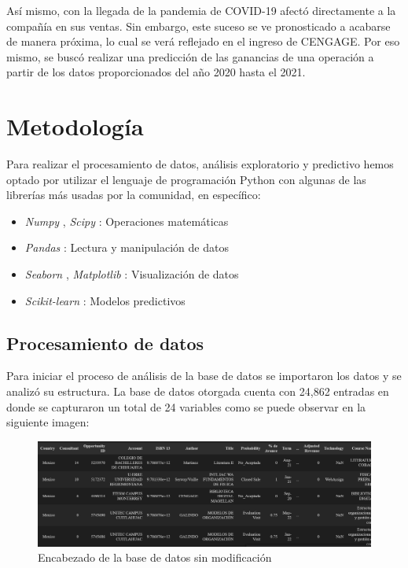 \documentclass{article}
\begin{document}
        Así mismo, con la llegada de la pandemia de COVID-19 afectó directamente a la compañía en sus ventas. Sin embargo, este suceso se ve pronosticado a acabarse de manera próxima, lo cual se verá reflejado en el ingreso de CENGAGE. Por eso mismo, se buscó realizar una predicción de las ganancias de una operación a partir de los datos proporcionados del año 2020 hasta el 2021.

    \section{Metodología}

        Para realizar el procesamiento de datos, análisis exploratorio y predictivo hemos optado por utilizar el lenguaje de programación Python con algunas de las librerías más usadas por la comunidad, en específico:

        \begin{itemize}
            \item \emph{Numpy} \parencite{numpy}, \emph{Scipy} \parencite{2020SciPy-NMeth}: Operaciones matemáticas
            \item \emph{Pandas} \parencite{reback2020pandas}: Lectura y manipulación de datos
            \item \emph{Seaborn} \parencite{seaborn}, \emph{Matplotlib} \parencite{matplotlib}: Visualización de datos
            \item \emph{Scikit-learn} \parencite{scikit-learn}: Modelos predictivos
        \end{itemize}

        \subsection{Procesamiento de datos}

        Para iniciar el proceso de análisis de la base de datos se importaron los datos y se analizó su estructura. La base de datos otorgada cuenta con 24,862 entradas en donde se capturaron un total de 24 variables como se puede observar en la siguiente imagen:

        \begin{figure}[h]
            \centering
            \includegraphics[width=\columnwidth]{img/raw_data.png}
            \caption{Encabezado de la base de datos sin modificación}
            \label{fig:table}
        \end{figure}
\end{document}
